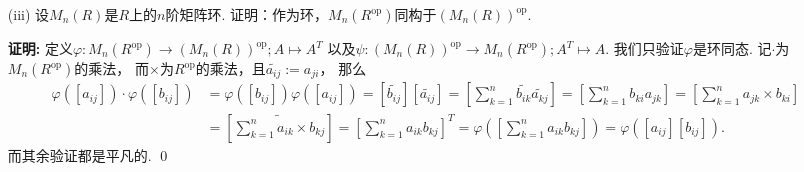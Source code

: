 \begin{enumerate}
    \item[(iii)] 设$M_{n}(R)$是$R$上的$n$阶矩阵环.
        证明：作为环，$M_{n}(R^{\mathrm{op}})$同构于$(M_{n}(R))^{\mathrm{op}}$.
    \item[\textbf{证明:}]
        定义$\varphi:M_{n}(R^{\mathrm{op}}) \rightarrow (M_{n}(R))^{\mathrm{op}};A \mapsto A^{T}$
        以及$\psi:(M_{n}(R))^{\mathrm{op}} \rightarrow M_{n}(R^{\mathrm{op}});A^{T} \mapsto A$.
        我们只验证$\varphi$是环同态. 记$\cdot$为$M_{n}(R^{\mathrm{op}})$的乘法，
        而$\times$为$R^{\mathrm{op}}$的乘法，且$\widetilde{a_{ij}}:=a_{ji}$，
        那么
        \begin{equation*}\begin{aligned}
            \varphi([a_{ij}]) \cdot \varphi([b_{ij}]) 
            &= \varphi([b_{ij}])\varphi([a_{ij}])
            = [\widetilde{b_{ij}}][\widetilde{a_{ij}}]
            = [\sum_{k=1}^{n}\widetilde{b_{ik}}\widetilde{a_{kj}}]
            = [\sum_{k=1}^{n}b_{ki}a_{jk}]
            = [\sum_{k=1}^{n}a_{jk} \times b_{ki}] \\
            &= [\widetilde{\sum_{k=1}^{n}a_{ik} \times b_{kj}}]
            = [\sum_{k=1}^{n}a_{ik}b_{kj}]^{T}
            = \varphi([\sum_{k=1}^{n}a_{ik}b_{kj}])
            = \varphi([a_{ij}][b_{ij}]). 
        \end{aligned}\end{equation*}
        而其余验证都是平凡的. \qed


\end{enumerate}
